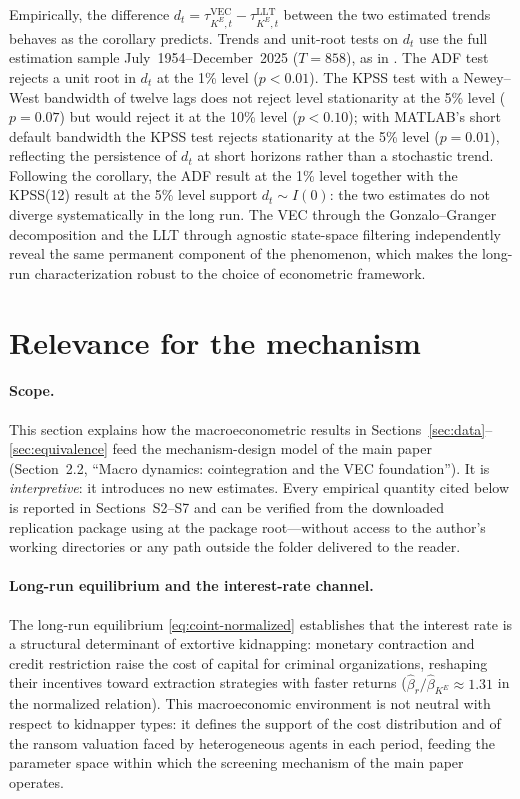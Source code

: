 \documentclass[12pt]{article}
\numberwithin{equation}{section}
\numberwithin{table}{section}
\theoremstyle{definition}
\newcommand{\KE}{K^{E}}
\begin{document}
Empirically, the difference
$d_t = \tau^{\mathrm{VEC}}_{\KE,t} - \tau^{\mathrm{LLT}}_{\KE,t}$ between
the two estimated trends behaves as the corollary predicts. Trends and
unit-root tests on $d_t$ use the full estimation sample July~1954--December~2025
($T=858$), as in . The ADF test rejects a unit
root in $d_t$ at the
1\% level ($p<0.01$). The KPSS test with a Newey--West bandwidth of twelve
lags does not reject level stationarity at the 5\% level ($p=0.07$) but
would reject it at the 10\% level ($p<0.10$); with MATLAB's short default
bandwidth the KPSS test rejects stationarity at the 5\% level ($p=0.01$),
reflecting the persistence of $d_t$ at short horizons rather than a stochastic
trend. Following the corollary, the ADF result at the 1\% level together
with the KPSS(12) result at the 5\% level support $d_t\sim I(0)$: the two
estimates do not diverge systematically in the long run. The VEC through the
Gonzalo--Granger decomposition and the LLT through agnostic state-space
filtering independently reveal the same permanent component of the
phenomenon, which makes the long-run characterization robust to the choice
of econometric framework.

\section{Relevance for the mechanism}
\label{sec:relevance}

\paragraph{Scope.}
This section explains how the macroeconometric results in
Sections~\ref{sec:data}--\ref{sec:equivalence} feed the mechanism-design model
of the main paper (Section~2.2, ``Macro dynamics: cointegration and the VEC
foundation''). It is \emph{interpretive}: it introduces no new estimates. Every
empirical quantity cited below is reported in Sections~S2--S7 and can be
verified from the downloaded replication package using
 at the package root---without access to the author's
working directories or any path outside the folder delivered to the reader.

\paragraph{Long-run equilibrium and the interest-rate channel.}
The long-run equilibrium \eqref{eq:coint-normalized} establishes that the
interest rate is a structural determinant of extortive kidnapping: monetary
contraction and credit restriction raise the cost of capital for criminal
organizations, reshaping their incentives toward extraction strategies with
faster returns ($\hat\beta_r/\hat\beta_{\KE}\approx 1.31$ in the normalized
relation). This macroeconomic environment is not neutral with respect to
kidnapper types: it defines the support of the cost distribution and of the
ransom valuation faced by heterogeneous agents in each period, feeding the
parameter space within which the screening mechanism of the main paper
operates.
\end{document}
